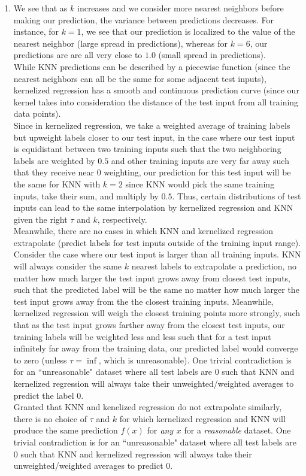 \documentclass[submit]{harvardml}
\begin{document}
\begin{enumerate}
    \item  We see that as $k$ increases and we consider more nearest neighbors before making our prediction, the variance between predictions decreases. For instance, for $k=1$, we see that our prediction is localized to the value of the nearest neighbor (large spread in predictions), whereas for $k=6$, our predictions are are all very close to $1.0$ (small spread in predictions). \\
    While KNN predictions can be described by a piecewise function (since the nearest neighbors can all be the same for some adjacent test inputs), kernelized regression has a smooth and continuous prediction curve (since our kernel takes into consideration the distance of the test input from all training data points). \\
    Since in kernelized regression, we take a weighted average of training labels but upweight labels closer to our test input, in the case where our test input is equidistant between two training inputs such that the two neighboring labels are weighted by $0.5$ and other training inputs are very far away such that they receive near $0$ weighting, our prediction for this test input will be the same for KNN with $k=2$ since KNN would pick the same training inputs, take their sum, and multiply by $0.5$. Thus, certain distributions of test inputs can lead to the same interpolation by kernelized regression and KNN given the right $\tau$ and $k$, respectively. \\
    Meanwhile, there are no cases in which KNN and kernelized regression extrapolate (predict labels for test inputs outside of the training input range). Consider the case where our test input is larger than all training inputs. KNN will always consider the same $k$ nearest labels to extrapolate a prediction, no matter how much larger the test input grows away from closest test inputs, such that the predicted label will be the same no matter how much larger the test input grows away from the the closest training inputs. Meanwhile, kernelized regression will weigh the closest training points more strongly, such that as the test input grows farther away from the closest test inputs, our training labels will be weighted less and less such that for a test input infinitely far away from the training data, our predicted label would converge to zero (unless $\tau = \inf$, which is unreasonable). One trivial contradiction is for an ``unreasonable" dataset where all test labels are $0$ such that KNN and kernelized regression will always take their unweighted/weighted averages to predict the label $0$.\\
    Granted that KNN and kenelized regression do not extrapolate similarly, there is no choice of $\tau$ and $k$ for which kernelized regression and KNN will produce the same prediction $f(x)$ for $\emph{any}$ $x$ for a \textit{reasonable} dataset. One trivial contradiction is for an ``unreasonable" dataset where all test labels are $0$ such that KNN and kernelized regression will always take their unweighted/weighted averages to predict $0$.
    

\end{enumerate}
\end{document}
